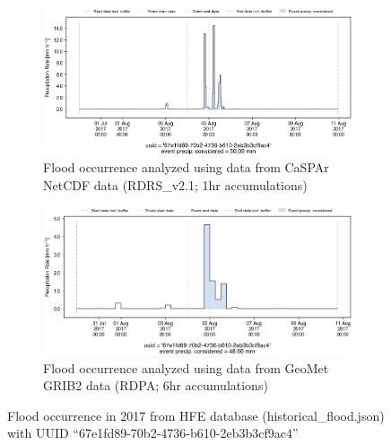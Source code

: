\documentclass[10pt,a4paper,titlepage,parskip]{scrartcl}
\begin{document}
\begin{figure}[h]
	\begin{subfigure}[a]{1.0\textwidth}
		\centering
		\includegraphics[width=\linewidth]{figures/compare_Geomet_CaSPAr/interpolated_at_stations_occurrence_1737_identified-timesteps_RDRS_v2.1.png}
		\caption{Flood occurrence analyzed using data from CaSPAr NetCDF data (RDRS\_v2.1; 1hr accumulations)}
	\end{subfigure}
	\par\bigskip\bigskip
	\begin{subfigure}[b]{1.0\textwidth}
		\centering
		\includegraphics[width=\linewidth]{figures/compare_Geomet_CaSPAr/interpolated_at_stations_occurrence_1737_identified-timesteps_rdpa:10km:6f.png}
		\caption{Flood occurrence analyzed using data from GeoMet GRIB2 data (RDPA; 6hr accumulations)}
	\end{subfigure}
	\par\bigskip\bigskip
	\caption{Flood occurrence in 2017 from HFE database (historical\_flood.json) with UUID ``67e1fd89-70b2-4736-b610-2eb3b3cf9ac4''}
\end{figure}
\pagebreak
\end{document}
